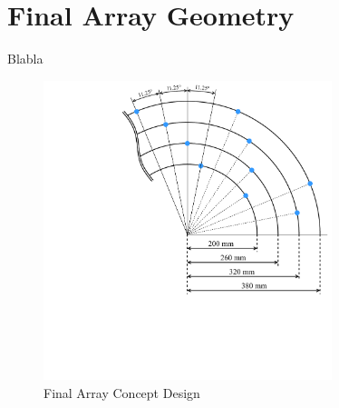 


\newpage
\section{Final Array Geometry} \label{sec:final_array_geometry}
Blabla

\begin{figure}[h]
	\centering
	\includegraphics[width=0.75\textwidth, trim={5.5cm 6.0cm 0 0}]{images/5_array_evaluation/final_array_concept_design.pdf}
	\caption{Final Array Concept Design}
	\label{fig:final_array_concept_design}
\end{figure}
